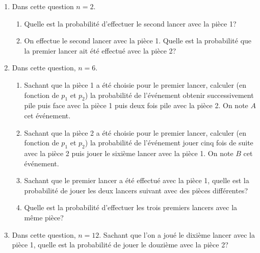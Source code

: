 \begin{enumerate}
 \item Dans cette question $n=2$.
 \begin{enumerate}
  \item Quelle est la probabilité d'effectuer le second lancer avec la pièce 1?
  \item On effectue le second lancer avec la pièce 1. Quelle est la probabilité que la premier lancer ait été effectué avec la pièce 2?
 \end{enumerate}

 \item Dans cette question, $n=6$.
 \begin{enumerate}
  \item Sachant que la pièce 1 a été choisie pour le premier lancer, calculer (en fonction de $p_1$ et $p_2$) la probabilité de l'événement \og obtenir successivement pile puis face avec la pièce 1 puis deux fois pile avec la pièce 2\fg. On note $A$ cet événement.
  \item Sachant que la pièce 2 a été choisie pour le premier lancer, calculer (en fonction de $p_1$ et $p_2$) la probabilité de l'événement \og jouer cinq fois de suite avec la pièce 2 puis jouer le sixième lancer avec la pièce 1\fg. On note $B$ cet événement.
  \item Sachant que le premier lancer a été effectué avec la pièce 1, quelle est la probabilité de jouer les deux lancers suivant avec des pièces différentes?
  \item Quelle est la probabilité d'effectuer les trois premiers lancers avec la même pièce?
 \end{enumerate}

 \item Dans cette question, $n=12$. Sachant que l'on a joué le dixième lancer avec la pièce 1, quelle est la probabilité de jouer le douzième avec la pièce 2?
\end{enumerate}
